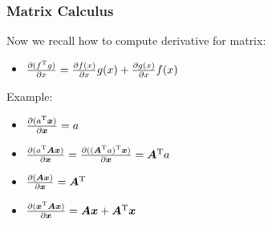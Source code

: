\begin{remark}
\subsubsection{Matrix Calculus}
Now we recall how to compute derivative for matrix:
\begin{itemize}
\item
$\frac{\partial(f^{\mathrm T} g)}{\partial x}=\frac{\partial f(x)}{\partial x}g(x)+\frac{\partial g(x)}{\partial x}f(x)$
\end{itemize}
Example:
\begin{itemize}
\item
$\frac{\partial(a^{\mathrm T} \bm x)}{\partial \bm x}=a$
\item
$\frac{\partial(a^{\mathrm T} \bm A\bm x)}{\partial \bm x}=\frac{\partial((\bm A^{\mathrm T} a)^{\mathrm T}\bm x)}{\partial \bm x}=\bm A^{\mathrm T} a$
\item
$\frac{\partial(\bm A\bm x)}{\partial \bm x}=\bm A^{\mathrm T}$
\item
$\frac{\partial(\bm x^{\mathrm T}\bm A\bm x)}{\partial \bm x}=\bm A\bm x+\bm A^{\mathrm T}\bm x$
\end{itemize}
\end{remark}
